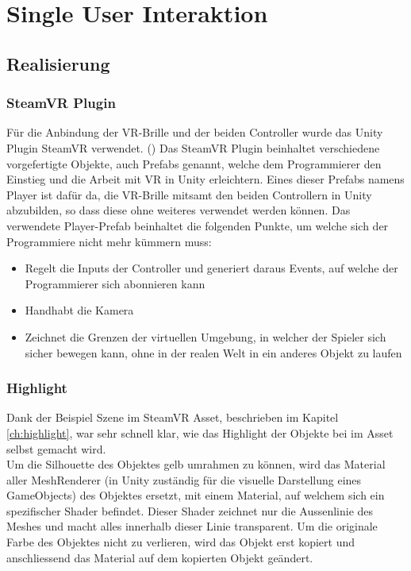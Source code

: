 \chapter{Single User Interaktion}
\label{ch:Single_User_Interaktion}

\section{Realisierung}

\subsection{SteamVR Plugin}
Für die Anbindung der VR-Brille und der beiden Controller wurde das Unity Plugin SteamVR verwendet. (\cite{noauthor_steamvr_2019}) Das SteamVR Plugin beinhaltet verschiedene vorgefertigte Objekte, auch Prefabs genannt, welche dem Programmierer den Einstieg und die Arbeit mit VR in Unity erleichtern. Eines dieser Prefabs namens \grqq Player\grqq{} ist dafür da, die VR-Brille mitsamt den beiden Controllern in Unity abzubilden, so dass diese ohne weiteres verwendet werden können. 
Das verwendete \grqq Player\grqq-Prefab beinhaltet die folgenden Punkte, um welche sich der Programmiere nicht mehr kümmern muss:

\begin{itemize} [itemsep=1pt,topsep=0pt]
	\item Regelt die Inputs der Controller und generiert daraus Events, auf welche der Programmierer sich abonnieren kann
	\item Handhabt die Kamera
	\item Zeichnet die Grenzen der virtuellen Umgebung, in welcher der Spieler sich sicher bewegen kann, ohne in der realen Welt in ein anderes Objekt zu laufen
\end{itemize}
 

\subsection{Highlight}
\label{ch:highlight_realisierung}
Dank der Beispiel Szene im SteamVR Asset, beschrieben im Kapitel \ref{ch:highlight}, war sehr schnell klar, wie das Highlight der Objekte bei im Asset selbst gemacht wird. \\
Um die Silhouette des Objektes gelb umrahmen zu können, wird das Material aller MeshRenderer (in Unity zuständig für die visuelle Darstellung eines GameObjects) des Objektes ersetzt, mit einem Material, auf welchem sich ein spezifischer Shader befindet. Dieser Shader zeichnet nur die Aussenlinie des Meshes und macht alles innerhalb dieser Linie transparent. Um die originale Farbe des Objektes nicht zu verlieren, wird das Objekt erst kopiert und anschliessend das Material auf dem kopierten Objekt geändert. \\

